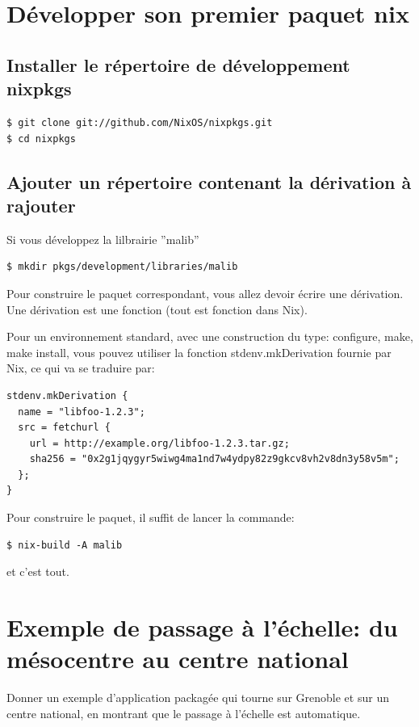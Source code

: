 \documentclass[final]{beamer}
\begin{document}
\begin{frame}[fragile]
\begin{multicols}{3}
\section{Développer son premier paquet nix}

\subsection{Installer le répertoire de développement nixpkgs}

\begin{verbatim}
$ git clone git://github.com/NixOS/nixpkgs.git 
$ cd nixpkgs
\end{verbatim}

\subsection{Ajouter un répertoire contenant la dérivation à rajouter}
Si vous développez la lilbrairie  ''malib''

\begin{verbatim}
$ mkdir pkgs/development/libraries/malib
\end{verbatim}

Pour construire le paquet correspondant, vous allez devoir écrire une dérivation. Une dérivation est une fonction (tout est fonction dans Nix). 

Pour un environnement standard, avec une construction du type: configure, make, make install, vous pouvez utiliser la fonction stdenv.mkDerivation fournie par Nix, ce qui va se traduire par:

\begin{verbatim}
stdenv.mkDerivation {
  name = "libfoo-1.2.3";
  src = fetchurl {
    url = http://example.org/libfoo-1.2.3.tar.gz;
    sha256 = "0x2g1jqygyr5wiwg4ma1nd7w4ydpy82z9gkcv8vh2v8dn3y58v5m";
  };
}
\end{verbatim}

Pour construire le paquet, il suffit de lancer la commande:

\begin{verbatim}
$ nix-build -A malib
\end{verbatim}

et c'est tout.

\section{Exemple de passage à l'échelle: du mésocentre au centre national}
Donner un exemple d'application packagée qui tourne sur Grenoble et sur un centre national, en montrant que le passage à l'échelle est automatique.












\end{multicols}
\end{frame}
\end{document}
